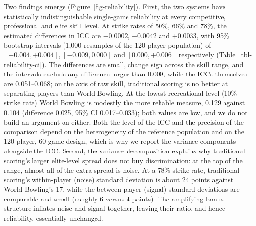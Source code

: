 \documentclass[
  letterpaper,
  DIV=11,
  numbers=noendperiod]{scrartcl}
\begin{document}
Two findings emerge (Figure~\ref{fig-reliability}). First, the two
systems have statistically indistinguishable single-game reliability at
every competitive, professional and elite skill level. At strike rates
of 50\%, 66\% and 78\%, the estimated differences in ICC are
\(-0.0002\), \(-0.0042\) and \(+0.0033\), with 95\% bootstrap intervals
(1,000 resamples of the 120-player population) of \([-0.004, +0.004]\),
\([-0.009, 0.000]\) and \([0.000, +0.006]\) respectively
(Table~\ref{tbl-reliability-ci}). The differences are small, change sign
across the skill range, and the intervals exclude any difference larger
than 0.009, while the ICCs themselves are 0.051--0.068; on the axis of
raw skill, traditional scoring is no better at separating players than
World Bowling. At the lowest recreational level (10\% strike rate) World
Bowling is modestly the more reliable measure, 0.129 against 0.104
(difference 0.025, 95\% CI 0.017--0.033); both values are low, and we do
not build an argument on either. Both the level of the ICC and the
precision of the comparison depend on the heterogeneity of the reference
population and on the 120-player, 60-game design, which is why we report
the variance components alongside the ICC. Second, the variance
decomposition explains why traditional scoring's larger elite-level
spread does not buy discrimination: at the top of the range, almost all
of the extra spread is noise. At a 78\% strike rate, traditional
scoring's within-player (noise) standard deviation is about 24 points
against World Bowling's 17, while the between-player (signal) standard
deviations are comparable and small (roughly 6 versus 4 points). The
amplifying bonus structure inflates noise and signal together, leaving
their ratio, and hence reliability, essentially unchanged.
\end{document}
